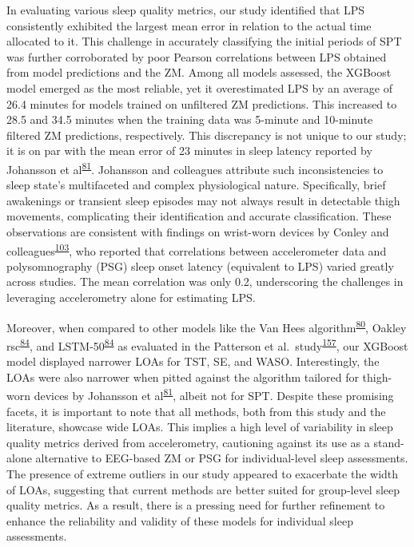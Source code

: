 \documentclass[
  10pt,
]{scrbook}
\begin{document}
In evaluating various sleep quality metrics, our study identified that
LPS consistently exhibited the largest mean error in relation to the
actual time allocated to it. This challenge in accurately classifying
the initial periods of SPT was further corroborated by poor Pearson
correlations between LPS obtained from model predictions and the ZM.
Among all models assessed, the XGBoost model emerged as the most
reliable, yet it overestimated LPS by an average of 26.4 minutes for
models trained on unfiltered ZM predictions. This increased to 28.5 and
34.5 minutes when the training data was 5-minute and 10-minute filtered
ZM predictions, respectively. This discrepancy is not unique to our
study; it is on par with the mean error of 23 minutes in sleep latency
reported by Johansson et
al\textsuperscript{\protect\hyperlink{ref-johansson_development_2023}{81}}.
Johansson and colleagues attribute such inconsistencies to sleep state's
multifaceted and complex physiological nature. Specifically, brief
awakenings or transient sleep episodes may not always result in
detectable thigh movements, complicating their identification and
accurate classification. These observations are consistent with findings
on wrist-worn devices by Conley and
colleagues\textsuperscript{\protect\hyperlink{ref-conley_agreement_2019}{103}},
who reported that correlations between accelerometer data and
polysomnography (PSG) sleep onset latency (equivalent to LPS) varied
greatly across studies. The mean correlation was only 0.2, underscoring
the challenges in leveraging accelerometry alone for estimating LPS.

Moreover, when compared to other models like the Van Hees
algorithm\textsuperscript{\protect\hyperlink{ref-hees_novel_2015}{80}},
Oakley
rsc\textsuperscript{\protect\hyperlink{ref-palotti_benchmark_2019}{84}},
and
LSTM-50\textsuperscript{\protect\hyperlink{ref-palotti_benchmark_2019}{84}}
as evaluated in the Patterson et
al.~study\textsuperscript{\protect\hyperlink{ref-patterson_40_2023}{157}},
our XGBoost model displayed narrower LOAs for TST, SE, and WASO.
Interestingly, the LOAs were also narrower when pitted against the
algorithm tailored for thigh-worn devices by Johansson et
al\textsuperscript{\protect\hyperlink{ref-johansson_development_2023}{81}},
albeit not for SPT. Despite these promising facets, it is important to
note that all methods, both from this study and the literature, showcase
wide LOAs. This implies a high level of variability in sleep quality
metrics derived from accelerometry, cautioning against its use as a
stand-alone alternative to EEG-based ZM or PSG for individual-level
sleep assessments. The presence of extreme outliers in our study
appeared to exacerbate the width of LOAs, suggesting that current
methods are better suited for group-level sleep quality metrics. As a
result, there is a pressing need for further refinement to enhance the
reliability and validity of these models for individual sleep
assessments.
\end{document}
